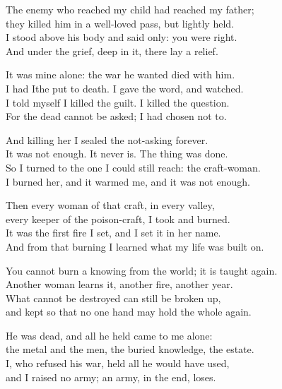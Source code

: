 \begin{founder}
The enemy who reached my child had reached my father;\\
they killed him in a well-loved pass, but lightly held.\\
I stood above his body and said only: you were right.\\
And under the grief, deep in it, there lay a relief.\\
\medskip

It was mine alone: the war he wanted died with him.\\
I had Ithe put to death. I gave the word, and watched.\\
I told myself I killed the guilt. I killed the question.\\
For the dead cannot be asked; I had chosen not to.\\
\medskip

And killing her I sealed the not-asking forever.\\
It was not enough. It never is. The thing was done.\\
So I turned to the one I could still reach: the craft-woman.\\
I burned her, and it warmed me, and it was not enough.\\
\medskip

Then every woman of that craft, in every valley,\\
every keeper of the poison-craft, I took and burned.\\
It was the first fire I set, and I set it in her name.\\
And from that burning I learned what my life was built on.\\
\medskip

You cannot burn a knowing from the world; it is taught again.\\
Another woman learns it, another fire, another year.\\
What cannot be destroyed can still be broken up,\\
and kept so that no one hand may hold the whole again.\\

\ornament

He was dead, and all he held came to me alone:\\
the metal and the men, the buried knowledge, the estate.\\
I, who refused his war, held all he would have used,\\
and I raised no army; an army, in the end, loses.\\
\medskip


\end{founder}
